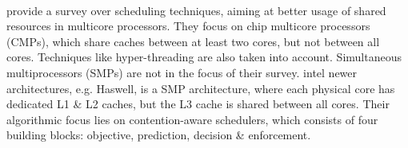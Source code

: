 \paragraph{ \cite{zhuravlev_survey_2012} } \citeauthor{zhuravlev_survey_2012}
provide a survey over scheduling techniques, aiming at better usage of shared
resources in multicore processors.
They focus on chip multicore processors (CMPs), which share caches between at
least two cores, but not between all cores.
Techniques like hyper-threading are also taken into account.
Simultaneous multiprocessors (SMPs) are not in the focus of their survey.
\gls{intel} newer architectures, e.g. Haswell, is a SMP architecture, where each
physical core has dedicated L1 \& L2 caches, but the L3 cache is shared between
all cores.
Their algorithmic focus lies on contention-aware schedulers, which consists of
four building blocks: objective, prediction, decision \& enforcement.



\paragraph{ \cite{knauerhase_using_2008} }
\paragraph{ \cite{yarom_recovering_2014} }
\paragraph{ \cite{bernstein_cache-timing_2005} }
\paragraph{ \cite{eyerman_probabilistic_2010} }
\paragraph{ \cite{fedorova_managing_2010} }
\paragraph{ \cite{zhuravlev_addressing_2010} }
\paragraph{ \cite{liu_last-level_2015} }
\paragraph{ \cite{ousterhout_john_k._scheduling_1982} }
\paragraph{ \cite{watts_practical_1998} }
